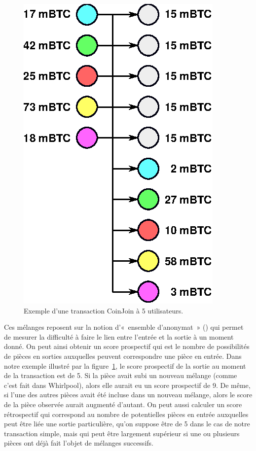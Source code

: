 \begin{figure}[ht]
  \centering
  \includegraphics[scale=0.85]{img/coinjoin-transaction-5i-10o.eps}
  \caption{Exemple d'une transaction CoinJoin à 5 utilisateurs.}
  \label{fig:coinjoin-transaction}
\end{figure}

Ces mélanges reposent sur la notion d'«~ensemble d'anonymat~» () qui permet de mesurer la difficulté à faire le lien entre l'entrée et la sortie à un moment donné. On peut ainsi obtenir un score prospectif qui est le nombre de possibilités de pièces en sorties auxquelles peuvent correspondre une pièce en entrée. Dans notre exemple illustré par la figure~\ref{fig:coinjoin-transaction}, le score prospectif de la sortie au moment de la transaction est de 5. Si la pièce avait subi un nouveau mélange (comme c'est fait dans Whirlpool), alors elle aurait eu un score prospectif de 9. De même, si l'une des autres pièces avait été incluse dans un nouveau mélange, alors le score de la pièce observée aurait augmenté d'autant. On peut aussi calculer un score rétrospectif qui correspond au nombre de potentielles pièces en entrée auxquelles peut être liée une sortie particulière, qu'on suppose être de 5 dans le cas de notre transaction simple, mais qui peut être largement supérieur si une ou plusieurs pièces ont déjà fait l'objet de mélanges successifs. 

